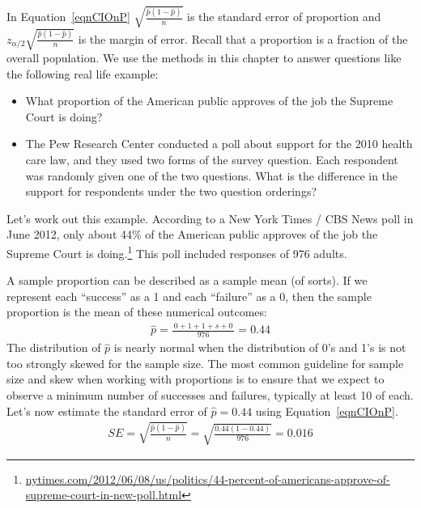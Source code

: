 In Equation~\ref{eqnCIOnP} $\sqrt{ \frac{\hat{p}(1 - \hat{p})}{n} }$ is the standard error of proportion
and $z_{\alpha / 2} 	\sqrt{ \frac{\hat{p}(1 - \hat{p})}{n} }$ is the margin of error.
Recall that a proportion is a fraction of the overall population.
We use the methods in this chapter to answer questions like the following real life example:
\begin{itemize}
\setlength{\itemsep}{0mm}
\item What proportion of the American public approves of the job the Supreme Court is doing?
\item The Pew Research Center conducted a poll about support for the 2010 health care law, and they used two forms of the survey question. Each respondent was randomly given one of the two questions. What is the difference in the support for respondents under the two question orderings?
\end{itemize}



Let's work out this example.
According to a New York Times / CBS News poll in June 2012, only about 44\% of the American public approves of the job the Supreme Court is doing.\footnote{\href{http://www.nytimes.com/2012/06/08/us/politics/44-percent-of-americans-approve-of-supreme-court-in-new-poll.html}{\scriptsize nytimes.com/2012/06/08/us/politics/44-percent-of-americans-approve-of-supreme-court-in-new-poll.html}} This poll included responses of 976 adults.

A sample proportion can be described as a sample mean (of sorts). If we represent each ``success'' as a 1 and each ``failure'' as a 0, then the sample proportion is the mean of these numerical outcomes:
\begin{eqnarray*}
\hat{p} = \frac{\ 0 + 1 + 1 + s + 0\ }{976} = 0.44
\end{eqnarray*}
The distribution of $\hat{p}$ is nearly normal when the distribution of 0's and 1's is not too strongly skewed for the sample size. The most common guideline for sample size and skew when working with proportions is to ensure that we expect to observe a minimum number of successes and failures, typically at least 10 of each.
Let's now estimate the standard error of $\hat{p}=0.44$ using Equation~\eqref{eqnCIOnP}. 
\begin{align*}
SE = \sqrt{\frac{\hat{p}(1-\hat{p})}{n}} = \sqrt{\frac{0.44(1-0.44)}{976}} = 0.016
\end{align*}


